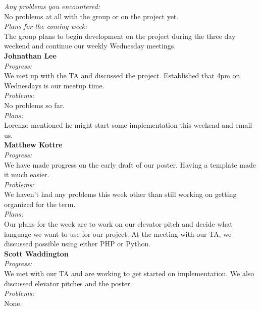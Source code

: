 \noindent\textit{Any problems you encountered:}\\
\noindent No problems at all with the group or on the project yet.\\

\noindent\textit{Plans for the coming week:}\\
\noindent The group plans to begin development on the project during the three day weekend and continue our weekly Wednesday meetings.\\

\noindent\textbf{Johnathan Lee}\\
\noindent\textit{Progress:}\\
We met up with the TA and discussed the project. Established that 4pm on Wednesdays is our meetup time. \\ 

\noindent\textit{Problems:}\\
\noindent No problems so far.\\

\noindent\textit{Plans:}\\
\noindent Lorenzo mentioned he might start some implementation this weekend and email us.\\

\noindent\textbf{Matthew Kottre}\\
\noindent\textit{Progress:}\\
We have made progress on the early draft of our poster. Having a template made it much easier.\\

\noindent\textit{Problems:}\\
\noindent We haven't had any problems this week other than still working on getting organized for the term.\\

\noindent\textit{Plans:}\\
\noindent Our plans for the week are to work on our elevator pitch and decide what language we want to use for our project. At the meeting with our TA, we discussed possible using either PHP or Python.\\

\noindent\textbf{Scott Waddington}\\
\noindent\textit{Progress:}\\
We met with our TA and are working to get started on implementation. We also discussed elevator pitches and the poster.\\

\noindent\textit{Problems:}\\
\noindent None.\\

